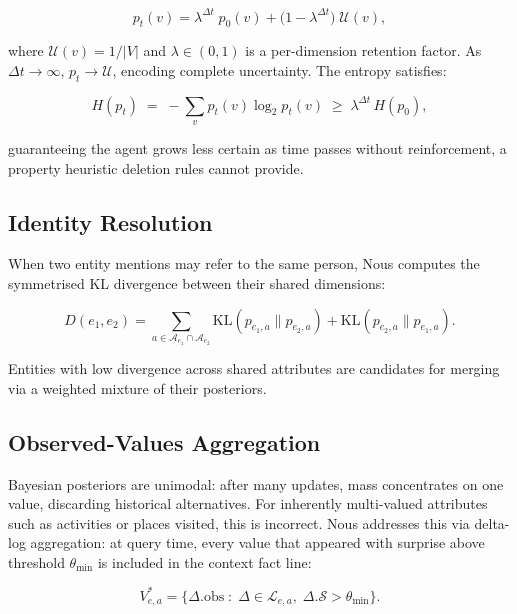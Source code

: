 \documentclass[11pt,a4paper,twocolumn]{article}
\begin{document}
\begin{equation}
  p_t(v) = \lambda^{\Delta t}\; p_0(v)
          + \bigl(1 - \lambda^{\Delta t}\bigr)\; \mathcal{U}(v),
  \label{eq:decay}
\end{equation}

where $\mathcal{U}(v) = 1/|V|$ and $\lambda \in (0,1)$ is a per-dimension
retention factor. As $\Delta t \to \infty$, $p_t \to \mathcal{U}$, encoding
complete uncertainty. The entropy satisfies:

\begin{equation}
  H(p_t) \;=\; -\sum_{v} p_t(v) \log_2 p_t(v) \;\geq\; \lambda^{\Delta t}\, H(p_0),
  \label{eq:entropy}
\end{equation}

guaranteeing the agent grows less certain as time passes without
reinforcement, a property heuristic deletion rules cannot provide.

\subsection{Identity Resolution}

When two entity mentions may refer to the same person, Nous computes the
symmetrised KL divergence between their shared dimensions:

\begin{equation}
  D(e_1, e_2) = \sum_{a \in \mathcal{A}_{e_1} \cap \mathcal{A}_{e_2}}
  \!\mathrm{KL}(p_{e_1,a} \| p_{e_2,a})
  + \mathrm{KL}(p_{e_2,a} \| p_{e_1,a}).
  \label{eq:kl}
\end{equation}

Entities with low divergence across shared attributes are candidates for
merging via a weighted mixture of their posteriors.

\subsection{Observed-Values Aggregation}
\label{sec:obsvals}

Bayesian posteriors are unimodal: after many updates, mass concentrates on
one value, discarding historical alternatives. For inherently multi-valued
attributes such as activities or places visited, this is incorrect. Nous
addresses this via delta-log aggregation: at query time, every value that
appeared with surprise above threshold $\theta_{\min}$ is included in the
context fact line:

\begin{equation}
  V^*_{e,a} = \bigl\{
    \Delta.\text{obs} \;:\;
    \Delta \in \mathcal{L}_{e,a},\;
    \Delta.\mathcal{S} > \theta_{\min}
  \bigr\}.
  \label{eq:obsvals}
\end{equation}
\end{document}

